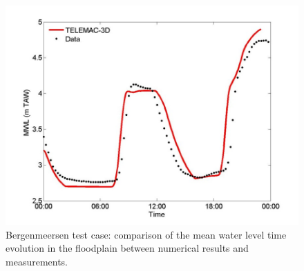 \begin{figure}[H]
\begin{center}
  \includegraphics[scale=1]{figure6.png}
\end{center}
\caption{Bergenmeersen test case: comparison of the mean water level time 
evolution in the floodplain between numerical results and measurements.}
\label{fig:bergenmeersen_figure6}
\end{figure}

